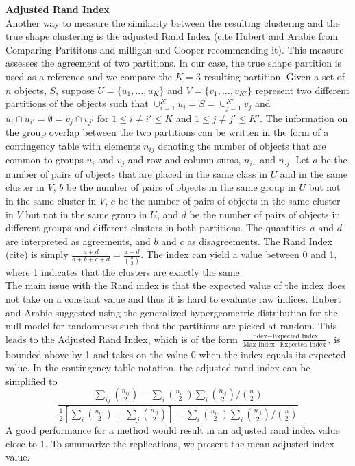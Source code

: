 \documentclass[12pt]{article}
\begin{document}
\textbf{Adjusted Rand Index}\\
Another way to measure the similarity between  the resulting clustering and the true shape clustering is the adjusted Rand Index (cite Hubert and Arabie from Comparing Parititons and milligan and Cooper recommending it). This measure assesses the agreement of two partitions. In our case, the true shape partition is used as a reference and we compare the $K=3$ resulting partition. 
Given a set of $n$ objects, $S$, suppose $U = \{u_{1},...,u_{K}\}$ and $V=\{v_{1},...,v_{K'}\}$ represent two different partitions of the objects such that $\cup^{K}_{i=1}u_{i} = S = \cup^{K'}_{j=1}v_{j}$ and $u_{i}\cap u_{i'} = \emptyset = v_{j}\cap v_{j'}$ for $1\leq i\not=i'\leq K$ and $1\leq j\not= j'\leq K'$. The information on the group overlap between the two partitions can be written in the form of a contingency table with elements $n_{ij}$ denoting the number of objects that are common to groups $u_{i}$ and $v_{j}$ and row and column sums, $n_{i\cdot}$ and $n_{\cdot j}$. Let $a$ be the number of pairs of objects that are placed in the same class in $U$ and in the same cluster in $V$, $b$ be the number of pairs of objects in the same group in $U$ but not in the same cluster in $V$, $c$ be the number of pairs of objects in the same cluster in $V$ but not in the same group in $U$, and $d$ be the number of pairs of objects in different groups and different clusters in both partitions. The quantities $a$ and $d$ are interpreted as agreements, and $b$ and $c$ as disagreements. The Rand Index (cite) is simply $\frac{a+d}{a+b+c+d}=\frac{a+d}{{n \choose 2}}$.  The index can yield a value between 0 and 1, where 1 indicates that the clusters are exactly the same.\\
The main issue with the Rand index is that the expected value of the index does not take on a constant value and thus it is hard to evaluate raw indices. Hubert and Arabie suggested using the generalized hypergeometric distribution for the null model for randomness such that the partitions are picked at random. This leads to the Adjusted Rand Index, which is of the form $\frac{\text{Index} - \text{Expected Index}}{\text{Max Index}-\text{Expected Index}}$, is bounded above by 1 and takes on the value 0 when the index equals its expected value. In the contingency table notation, the adjusted rand index can be simplified to
$$\frac{\sum_{ij}{n_{ij} \choose 2} - \sum_{i} {n_{i\cdot} \choose 2} \sum_{i} {n_{\cdot j} \choose 2} / {n \choose 2}}{\frac{1}{2}\left[\sum_{i}{n_{i\cdot} \choose 2}+\sum_{j}{n_{\cdot j} \choose 2}\right] - \sum_{i} {n_{i\cdot} \choose 2} \sum_{i} {n_{\cdot j} \choose 2} / {n \choose 2}}$$
A good performance for a method would result in an adjusted rand index value close to 1. To summarize the replications, we present the mean adjusted index value.\\
\end{document}
